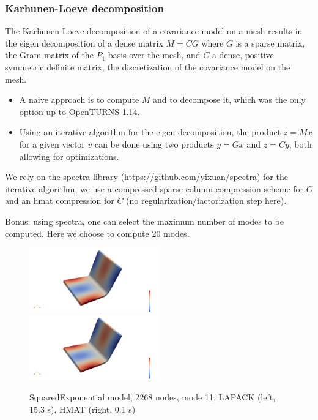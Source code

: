 \documentclass{beamer}
\begin{document}
\begin{frame}
\frametitle{Karhunen-Loeve decomposition}

The Karhunen-Loeve decomposition of a covariance model on a mesh results in the eigen decomposition of a dense matrix $M=CG$ where $G$ is a sparse matrix, the Gram matrix of the $P_1$ basis over the mesh, and $C$ a dense, positive symmetric definite matrix, the discretization of the covariance model on the mesh.

\begin{itemize}
\item A naive approach is to compute $M$ and to decompose it, which was the only option up to OpenTURNS 1.14.
\item Using an iterative algorithm for the eigen decomposition, the product $z=Mx$ for a given vector $v$ can be done using two products $y=Gx$ and $z=Cy$, both allowing for optimizations.
\end{itemize}

We rely on the \alert{spectra} library (https://github.com/yixuan/spectra) for the iterative algorithm, we use a compressed sparse column compression scheme for $G$ and an hmat compression for $C$ (no regularization/factorization step here).

\alert{Bonus: using spectra, one can select the maximum number of modes to be computed. Here we choose to compute 20 modes}.

\begin{figure}
\begin{center}
\includegraphics[width=0.5\textwidth]{figures/kl_lapack.png}%
\includegraphics[width=0.5\textwidth]{figures/kl_hmat.png}
\end{center}
\caption{SquaredExponential model, 2268 nodes, mode 11, LAPACK (left, 15.3 s), HMAT (right, 0.1 s)}
\end{figure}


\end{frame}
\end{document}
